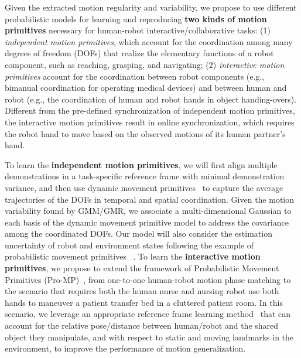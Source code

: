 \documentclass[letterpaper, 11 pt, onecolumn]{article}
\begin{document}
Given the extracted motion regularity and variability, we propose to use different probabilistic models for learning and reproducing \textbf{two kinds of motion primitives} necessary for human-robot interactive/collaborative tasks: (1) \textit{independent motion primitives}, which account for the coordination among many degrees of freedom (DOFs) that realize the elementary functions of a robot component, such as reaching, grasping, and navigating; (2) \textit{interactive  motion primitives} account for the coordination between robot components (e.g., bimanual coordination for operating medical devices) and between human and robot (e.g., the coordination of human and robot hands in object handing-overs). Different from the pre-defined synchronization of independent motion primitives, the interactive motion primitives result in online synchronization, which requires the robot hand to move based on the observed motions of its human partner's hand.

To learn the \textbf{independent motion primitives}, we will first align multiple demonstrations in a task-specific reference frame with minimal demonstration variance, and then use dynamic movement primitives~\cite{ijspeert2013dynamical} to capture the average trajectories of the DOFs in temporal and spatial coordination. Given the motion variability found by GMM/GMR, we associate a multi-dimensional Gaussian to each basis of the dynamic movement primitive model to address the covariance among the coordinated DOFs. Our model will also consider the estimation uncertainty of robot and environment states following the example of probabilistic movement primitives ~\cite{meier2016probabilistic}. To learn the \textbf{interactive motion primitives}, we propose to extend the framework of Probabilistic Movement Primitives (Pro-MP)~\cite{maeda2017phase}, from one-to-one human-robot motion phase matching to the scenario that requires both the human nurse and nursing robot use both hands to maneuver a patient transfer bed in a cluttered patient room. In this scenario, we leverage an appropriate reference frame learning method~\cite{cederborg2010incremental,dong2012learning} that can account for the relative pose/distance between human/robot and the shared object they manipulate, and with respect to static and moving landmarks in the environment, to improve the performance of motion generalization.

\end{document}
